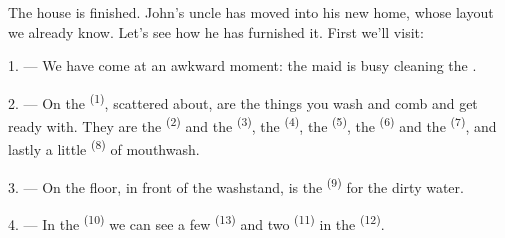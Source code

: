 %
%

\VUsaut{6.0mm}
\VUsaut{1.4mm}
\VUsaut{0.4mm}
\VUsaut{2.2mm}

The house is finished. John's uncle has moved into his new home, whose layout we already know.
Let's see how he has furnished it. First we'll visit:

\VUsaut{3.0mm}

1. --- We have come at an awkward moment: the maid is busy cleaning the .

2. --- On the  \textsuperscript{(1)}, scattered about, are the things you
wash and comb and get ready with. They are the  \textsuperscript{(2)} and the
 \textsuperscript{(3)}, the  \textsuperscript{(4)}, the
 \textsuperscript{(5)}, the
 \textsuperscript{(6)} and the  \textsuperscript{(7)}, and lastly a
little  \textsuperscript{(8)} of mouthwash.

3. --- On the floor, in front of the washstand, is the
 \textsuperscript{(9)} for the dirty water.

4. --- In the  \textsuperscript{(10)} we can see a few
 \textsuperscript{(13)} and two  \textsuperscript{(11)}
in the  \textsuperscript{(12)}.

